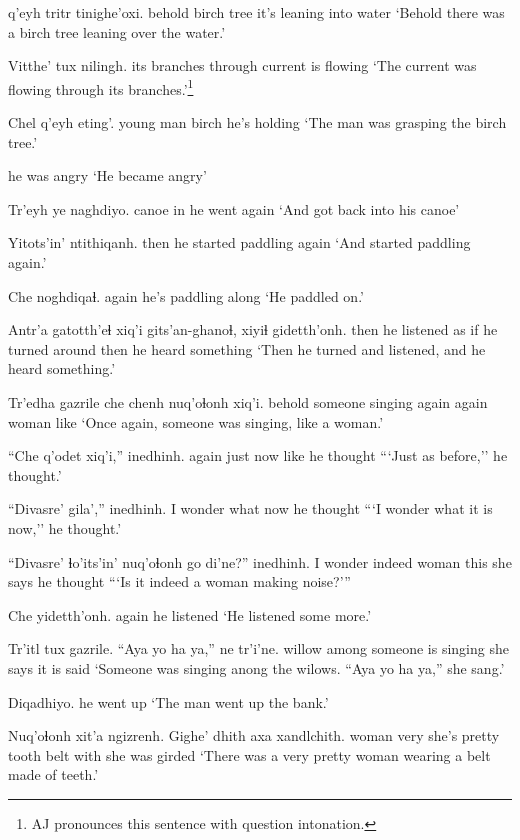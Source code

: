 \documentclass[12pt]{article}
\begin{document}
 q'eyh tritr tinighe'oxi.
behold   birch tree {it's leaning into water}
\glt `Behold there was a birch tree leaning over the water.'
\glend

\gll Vitthe' tux  nilingh.
{its branches} through {current is flowing}
\glt `The current was flowing through its branches.'\footnote{AJ pronounces this sentence with question intonation.}
\glend

\gll Chel q'eyh eting'.
{young man} birch {he's holding}
\glt `The man was grasping the birch tree.'
\glend

{{he was angry}}
\glt `He became angry'
\glend

\gll Tr'eyh ye naghdiyo.
canoe in {{he went again}}
\glt `And got back into his canoe'
\glend

\gll Yitots'in' ntithiqanh.
then  {he started paddling again}
\glt `And started paddling again.'
\glend

\gll Che noghdiqaɬ.
again {he's paddling along}
\glt `He paddled on.'
\glend

\gll Antr'a gatotth'eɬ xiq'i gits'an-ghanoɬ, xiyiɬ gidetth'onh.
then  {he listened} {as if} {he turned around}  then {he heard something}
\glt `Then he turned and listened, and he heard something.'
\glend

\gll Tr'edha gazrile  {che chenh} nuq'oɬonh xiq'i.
behold  {someone singing} {again again} woman  like
\glt `Once again, someone was singing, like a woman.'
\glend

\gll ``Che q'odet xiq'i,'' inedhinh.
again {just now} like {he thought}
\glt ```Just as before,'' he thought.'
\glend

\gll ``Divasre' gila','' inedhinh.
{I wonder what} now {he thought}
\glt ```I wonder what it is now,'' he thought.'
\glend

\gll ``Divasre' ɬo'its'in' nuq'oɬonh go di'ne?'' inedhinh.
{I wonder} indeed  woman  this {she says} {he thought}
\glt ```Is it indeed a woman making noise?'''
\glend

\gll Che yidetth'onh.
again {he listened}
\glt `He listened some more.'
\glend

\gll Tr'itl tux  gazrile. {``Aya yo ha ya,''} ne  tr'i'ne.
willow among {someone is singing} {} {she says} {it is said}
\glt `Someone was singing anong the wilows. ``Aya yo ha ya,'' she sang.'
\glend

\gll Diqadhiyo.
{{he went up}}
\glt `The man went up the bank.'
\glend

\gll Nuq'oɬonh xit'a ngizrenh. Gighe' dhith axa xandlchith.
woman very {she's pretty} tooth  belt with {she was girded}
\glt `There was a very pretty woman wearing a belt made of teeth.'
\glend
\end{document}
